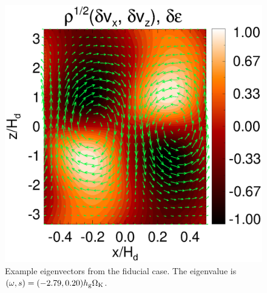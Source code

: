 \begin{figure}
  \includegraphics[width=\linewidth]{figures/result2d}
  \caption{Example eigenvectors from the fiducial case. The eigenvalue
    is $(\omega,s)=(-2.79,0.20)h_\mathrm{g}\Omega_{\rm K}$.  
    \label{eigen_2d}} 
\end{figure}
